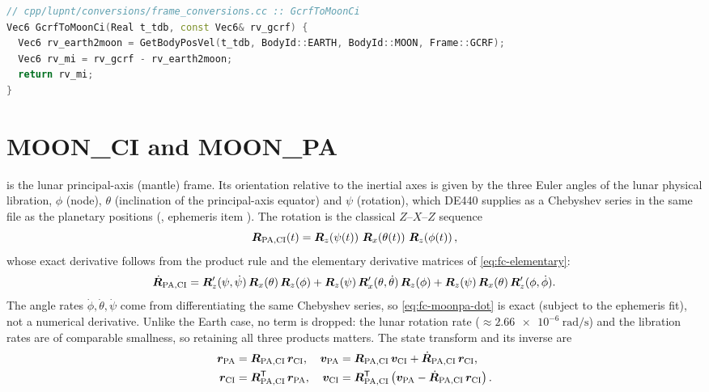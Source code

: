 \begin{lstlisting}[language=cpp, caption={GCRF to Moon-centered inertial ---
  a pure DE440 translation
  (\texttt{cpp/lupnt/conversions/frame\_conversions.cc}).},
  label={lst:fc-moonci}]
// cpp/lupnt/conversions/frame_conversions.cc :: GcrfToMoonCi
Vec6 GcrfToMoonCi(Real t_tdb, const Vec6& rv_gcrf) {
  Vec6 rv_earth2moon = GetBodyPosVel(t_tdb, BodyId::EARTH, BodyId::MOON, Frame::GCRF);
  Vec6 rv_mi = rv_gcrf - rv_earth2moon;
  return rv_mi;
}
\end{lstlisting}

\section{MOON\_CI and MOON\_PA}
\label{sec:fc-moonpa}

 is the lunar principal-axis (mantle) frame. Its orientation
relative to the inertial axes is given by the three Euler angles of the
lunar physical libration, $\phi$ (node), $\theta$ (inclination of the
principal-axis equator) and $\psi$ (rotation), which DE440 supplies as a
Chebyshev series in the same file as the planetary positions
(, ephemeris item
). The rotation is the classical
$Z$--$X$--$Z$ sequence
%
\begin{equation}
  \label{eq:fc-moonpa}
  \bm{R}_{\mathrm{PA},\mathrm{CI}}(t)
  = \bm{R}_z\!\left(\psi(t)\right)\,
    \bm{R}_x\!\left(\theta(t)\right)\,
    \bm{R}_z\!\left(\phi(t)\right),
\end{equation}
%
whose exact derivative follows from the product rule and the elementary
derivative matrices of \cref{eq:fc-elementary}:
%
\begin{equation}
  \label{eq:fc-moonpa-dot}
  \dot{\bm{R}}_{\mathrm{PA},\mathrm{CI}}
  = \bm{R}_z'(\psi,\dot\psi)\,\bm{R}_x(\theta)\,\bm{R}_z(\phi)
  + \bm{R}_z(\psi)\,\bm{R}_x'(\theta,\dot\theta)\,\bm{R}_z(\phi)
  + \bm{R}_z(\psi)\,\bm{R}_x(\theta)\,\bm{R}_z'(\phi,\dot\phi).
\end{equation}
%
The angle rates $\dot\phi,\dot\theta,\dot\psi$ come from differentiating the
same Chebyshev series, so \cref{eq:fc-moonpa-dot} is exact (subject to the
ephemeris fit), not a numerical derivative. Unlike the Earth case, no term
is dropped: the lunar rotation rate
($\approx\SI{2.66e-6}{\radian\per\second}$) and the libration rates are of
comparable smallness, so retaining all three products matters. The state
transform and its inverse are
%
\begin{align}
  \label{eq:fc-moonpa-vel}
  \bm{r}_{\mathrm{PA}} &= \bm{R}_{\mathrm{PA},\mathrm{CI}}\,\bm{r}_{\mathrm{CI}},
  &\bm{v}_{\mathrm{PA}} &= \bm{R}_{\mathrm{PA},\mathrm{CI}}\,\bm{v}_{\mathrm{CI}}
    + \dot{\bm{R}}_{\mathrm{PA},\mathrm{CI}}\,\bm{r}_{\mathrm{CI}}, \\
  \bm{r}_{\mathrm{CI}} &= \bm{R}_{\mathrm{PA},\mathrm{CI}}^{\mathsf{T}}\,\bm{r}_{\mathrm{PA}},
  &\bm{v}_{\mathrm{CI}} &= \bm{R}_{\mathrm{PA},\mathrm{CI}}^{\mathsf{T}}
    \left(\bm{v}_{\mathrm{PA}} - \dot{\bm{R}}_{\mathrm{PA},\mathrm{CI}}\,\bm{r}_{\mathrm{CI}}\right).
  \nonumber
\end{align}

